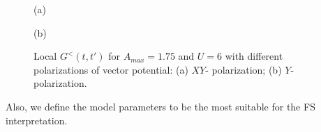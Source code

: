 \begin{figure}[h!]
\begin{minipage}[h]{0.5\linewidth}
 (a) \\
\end{minipage}
\hfill
\begin{minipage}[h]{0.5\linewidth}
 (b) \\
\end{minipage}
\caption{Local $G^{<}(t,t')$ for $A_{max}=1.75$ and $U=6$ with different polarizations of vector potential: (a) $XY$- polarization; (b) $Y$-polarization.}
\label{fig:G_loc_3d}
\end{figure}
Also, we define the model parameters to be the most suitable for the FS interpretation.

